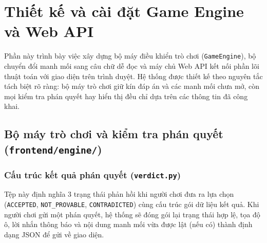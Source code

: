 \section{Thiết kế và cài đặt Game Engine và Web API}

Phần này trình bày việc xây dựng bộ máy điều khiển trò chơi (\texttt{GameEngine}), bộ chuyển đổi manh mối sang câu chữ dễ đọc và máy chủ Web API kết nối phần lõi thuật toán với giao diện trên trình duyệt. Hệ thống được thiết kế theo nguyên tắc tách biệt rõ ràng: bộ máy trò chơi giữ kín đáp án và các manh mối chưa mở, còn mọi kiểm tra phán quyết hay hiển thị đều chỉ dựa trên các thông tin đã công khai.

\subsection{Bộ máy trò chơi và kiểm tra phán quyết (\texttt{frontend/engine/})}

\subsubsection{Cấu trúc kết quả phán quyết (\texttt{verdict.py})}
Tệp này định nghĩa 3 trạng thái phản hồi khi người chơi đưa ra lựa chọn (\texttt{ACCEPTED}, \texttt{NOT\_PROVABLE}, \texttt{CONTRADICTED}) cùng cấu trúc gói dữ liệu kết quả. Khi người chơi gửi một phán quyết, hệ thống sẽ đóng gói lại trạng thái hợp lệ, tọa độ ô, lời nhắn thông báo và nội dung manh mối vừa được lật (nếu có) thành định dạng JSON để gửi về giao diện.

